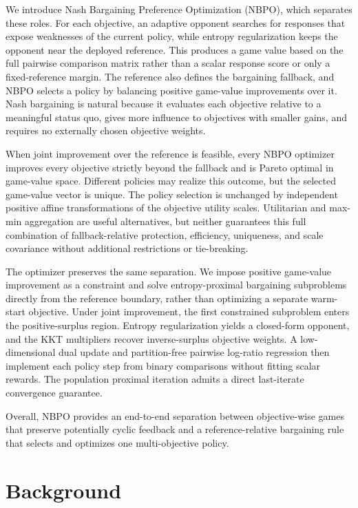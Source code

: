\documentclass{article}
\theoremstyle{remark}
\theoremstyle{plain}
\newcommand{\NBPO}{\textsc{NBPO}}
\begin{document}
We introduce Nash Bargaining Preference Optimization (\NBPO{}), which separates these roles. For each objective, an adaptive opponent searches for responses that expose weaknesses of the current policy, while entropy regularization keeps the opponent near the deployed reference. This produces a game value based on the full pairwise comparison matrix rather than a scalar response score or only a fixed-reference margin. The reference also defines the bargaining fallback, and \NBPO{} selects a policy by balancing positive game-value improvements over it. Nash bargaining is natural because it evaluates each objective relative to a meaningful status quo, gives more influence to objectives with smaller gains, and requires no externally chosen objective weights.

When joint improvement over the reference is feasible, every \NBPO{} optimizer improves every objective strictly beyond the fallback and is Pareto optimal in game-value space. Different policies may realize this outcome, but the selected game-value vector is unique. The policy selection is unchanged by independent positive affine transformations of the objective utility scales. Utilitarian and max-min aggregation are useful alternatives, but neither guarantees this full combination of fallback-relative protection, efficiency, uniqueness, and scale covariance without additional restrictions or tie-breaking.

The optimizer preserves the same separation. We impose positive game-value improvement as a constraint and solve entropy-proximal bargaining subproblems directly from the reference boundary, rather than optimizing a separate warm-start objective. Under joint improvement, the first constrained subproblem enters the positive-surplus region. Entropy regularization yields a closed-form opponent, and the KKT multipliers recover inverse-surplus objective weights. A low-dimensional dual update and partition-free pairwise log-ratio regression then implement each policy step from binary comparisons without fitting scalar rewards. The population proximal iteration admits a direct last-iterate convergence guarantee.

Overall, \NBPO{} provides an end-to-end separation between objective-wise games that preserve potentially cyclic feedback and a reference-relative bargaining rule that selects and optimizes one multi-objective policy.

\section{Background}
\label{sec:background}
\end{document}
